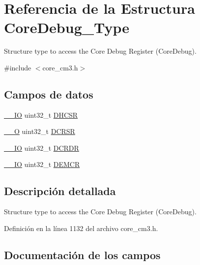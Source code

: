 \hypertarget{struct_core_debug___type}{}\section{Referencia de la Estructura Core\+Debug\+\_\+\+Type}
\label{struct_core_debug___type}


Structure type to access the Core Debug Register (Core\+Debug).  




{\ttfamily \#include $<$core\+\_\+cm3.\+h$>$}

\subsection*{Campos de datos}
\begin{DoxyCompactItemize}
\item 
\hyperlink{core__sc300_8h_aec43007d9998a0a0e01faede4133d6be}{\+\_\+\+\_\+\+IO} uint32\+\_\+t \hyperlink{struct_core_debug___type_a39bc5e68dc6071187fbe2348891eabfa}{D\+H\+C\+SR}
\item 
\hyperlink{core__sc300_8h_a7e25d9380f9ef903923964322e71f2f6}{\+\_\+\+\_\+O} uint32\+\_\+t \hyperlink{struct_core_debug___type_a7b49cb58573da77cc8a83a1b21262180}{D\+C\+R\+SR}
\item 
\hyperlink{core__sc300_8h_aec43007d9998a0a0e01faede4133d6be}{\+\_\+\+\_\+\+IO} uint32\+\_\+t \hyperlink{struct_core_debug___type_a5bcffe99d1d5471d5e5befbc6272ebf0}{D\+C\+R\+DR}
\item 
\hyperlink{core__sc300_8h_aec43007d9998a0a0e01faede4133d6be}{\+\_\+\+\_\+\+IO} uint32\+\_\+t \hyperlink{struct_core_debug___type_a6cdfc0a6ce3e988cc02c2d6e8107d193}{D\+E\+M\+CR}
\end{DoxyCompactItemize}


\subsection{Descripción detallada}
Structure type to access the Core Debug Register (Core\+Debug). 

Definición en la línea 1132 del archivo core\+\_\+cm3.\+h.



\subsection{Documentación de los campos}
